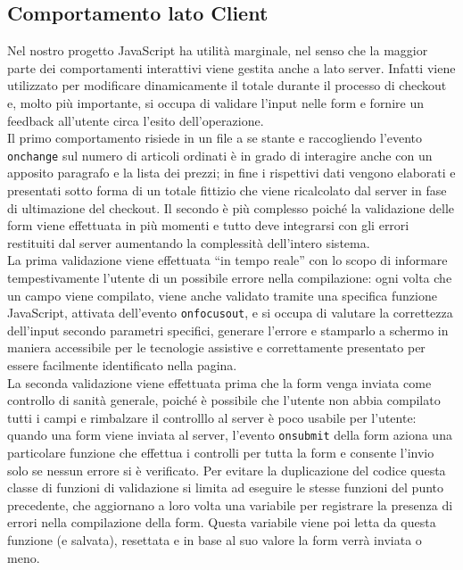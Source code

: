     \subsection{Comportamento lato Client}
    Nel nostro progetto JavaScript ha utilità marginale, nel senso che la maggior parte dei comportamenti interattivi viene gestita anche a lato server. Infatti viene utilizzato per modificare dinamicamente il totale durante il processo di checkout e, molto più importante, si occupa di validare l’input nelle form e fornire un feedback all’utente circa l’esito dell’operazione.\\
    Il primo comportamento risiede in un file a se stante e raccogliendo l’evento \texttt{onchange} sul numero di articoli ordinati è in grado di interagire anche con un apposito paragrafo e la lista dei prezzi; in fine i rispettivi dati vengono elaborati e presentati sotto forma di un totale fittizio che viene ricalcolato dal server in fase di ultimazione del checkout.
    Il secondo è più complesso poiché la validazione delle form viene effettuata in più momenti e tutto deve integrarsi con gli errori restituiti dal server aumentando la complessità dell’intero sistema.\\
    La prima validazione viene effettuata “in tempo reale” con lo scopo di informare tempestivamente l’utente di un possibile errore nella compilazione: ogni volta che un campo viene compilato, viene anche validato tramite una specifica funzione JavaScript, attivata dell’evento \texttt{onfocusout}, e si occupa di valutare la correttezza dell’input secondo parametri specifici, generare l’errore e stamparlo a schermo in maniera accessibile per le tecnologie assistive e correttamente presentato per essere facilmente identificato nella pagina.\\
    La seconda validazione viene effettuata prima che la form venga inviata come controllo di sanità generale, poiché è possibile che l’utente non abbia compilato tutti i campi e rimbalzare il controlllo al server è poco usabile per l’utente: quando una form viene inviata al server, l’evento \texttt{onsubmit} della form aziona una particolare funzione che effettua i controlli per tutta la form e consente l’invio solo se nessun errore si è verificato. Per evitare la duplicazione del codice questa classe di funzioni  di validazione si limita ad eseguire le stesse funzioni del punto precedente, che aggiornano a loro volta una variabile per registrare la presenza di errori nella compilazione della form. Questa variabile viene poi letta da questa funzione (e salvata), resettata e in base al suo valore la form verrà inviata o meno.